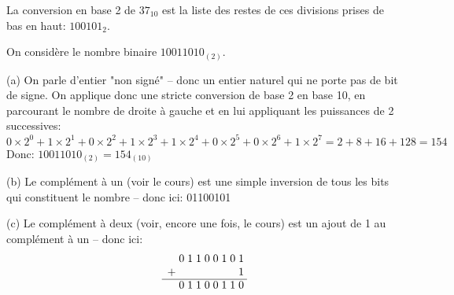 \documentclass[11pt,a4paper]{exam}
\begin{document}
\begin{questions}
\begin{spacing}{1}
\begin{solution}
					La conversion en base 2 de $37_{10}$ est la liste des restes de ces divisions prises de bas en haut: $100101_{2}$.
				\end{solution}
		
		
			On considère le nombre binaire $10011010_{(2)}$.
			
			\begin{solution}
				
				(a) On parle d'entier "non signé" -- donc un entier naturel qui ne porte pas de bit de signe. On applique donc une stricte conversion de base 2 en base 10, en parcourant le nombre de droite à gauche et en lui appliquant les puissances de 2 successives:
				\[
				0 \times 2^0 + 
				1 \times 2^1 + 
				0 \times 2^2 + 
				1 \times 2^3 + 
				1 \times 2^4 + 
				0 \times 2^5 + 
				0 \times 2^6 + 
				1 \times 2^7 
				= 2 + 8 + 16 + 128 
				= 154\]
				Donc: $10011010_{(2)} = 154_{(10)}$
				
				(b) Le complément à un (voir le cours) est une simple inversion de tous les bits qui constituent le nombre -- donc ici: 01100101
				
				(c) Le complément à deux (voir, encore une fois, le cours) est un ajout de 1 au complément à un -- donc ici:
					\[
				\begin{array}{r *{9}{@{\;}c}}
					& 0 & 1 & 1 & 0 & 0 & 1 & 0 & 1 \\
					+ &  &  &  &  &  &  &  & 1 \\
					\cline{1-9}
					& 0 & 1 & 1 & 0 & 0 & 1 & 1 & 0 \\
				\end{array}
				\]
				

\end{solution}
\end{spacing}
\end{questions}
\end{document}
